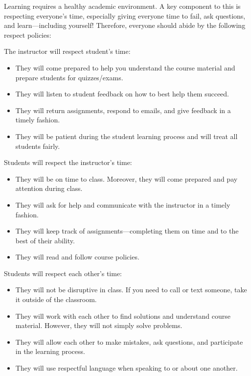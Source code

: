 \documentclass[11pt,letterpaper]{article}
\begin{document}

Learning requires a healthy academic environment. A key component to this is respecting everyone's time, especially giving everyone time to fail, ask questions, and learn---including yourself! Therefore, everyone should abide by the following respect policies: \pspace

The instructor will respect student's time:
	\begin{itemize}
	\item They will come prepared to help you understand the course material and prepare students for quizzes/exams. 
	\item They will listen to student feedback on how to best help them succeed. 
	\item They will return assignments, respond to emails, and give feedback in a timely fashion. 
	\item They will be patient during the student learning process and will treat all students fairly. 
	\end{itemize} \pspace

Students will respect the instructor's time:
	\begin{itemize}
	\item They will be on time to class. Moreover, they will come prepared and pay attention during class. 
	\item They will ask for help and communicate with the instructor in a timely fashion. 
	\item They will keep track of assignments---completing them on time and to the best of their ability.  
	\item They will read and follow course policies. 
	\end{itemize} \pspace





\newpage





Students will respect each other's time:
	\begin{itemize}
	\item They will not be disruptive in class. If you need to call or text someone, take it outside of the classroom. 
	\item They will work with each other to find solutions and understand course material. However, they will not simply solve problems. 
	\item They will allow each other to make mistakes, ask questions, and participate in the learning process. 
	\item They will use respectful language when speaking to or about one another. 
	\end{itemize}
\sectionbreak
\end{document}
